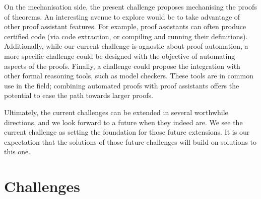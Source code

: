 \documentclass[runningheads]{llncs}
\begin{document}
On the mechanisation side, the present challenge proposes mechanising the
proofs of theorems. An interesting avenue to explore would be to take advantage
of other proof assistant features. For example, proof assistants can often
produce certified code (via code extraction, or compiling and running their
definitions). Additionally, while our current challenge is agnostic about proof
automation, a more specific challenge could be designed with the objective of
automating aspects of the proofs. Finally, a challenge could propose the
integration with other formal reasoning tools, such as model checkers. These
tools are in common use in the field; combining automated proofs with
proof assistants offers the potential to ease the path towards larger proofs.

Ultimately, the current challenges can be extended in several
worthwhile directions, and we look forward to a future when they
indeed are. We see the current challenge as setting
the foundation for those future extensions. It is our expectation that
the solutions of those future challenges will build on solutions
to this one.




\clearpage
\appendix
\section{Challenges}\label{app:challenges}

\end{document}
